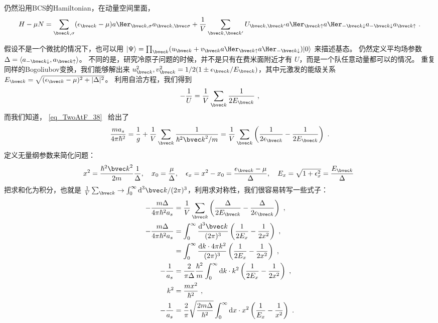 
仍然沿用BCS的Hamiltonian，在动量空间里面，
\begin{equation}
H-\mu N = \sum_{{\bvec k},\sigma}(\epsilon_{\bvec k}-\mu)a\Her_{{\bvec k},\sigma}a_{\bvec k, \bvec \sigma}+\frac{1}{V}\sum_{\bvec k,  \bvec k'}U_{\bvec k, \bvec k'}a\Her_{\bvec k\uparrow}a\Her_{-\bvec k\downarrow}a_{-\bvec k\downarrow}a_{\bvec k\uparrow}~.
\end{equation}


假设不是一个微扰的情况下，也可以用 $|\Psi\rangle = \prod_{\bvec k}(u_{\bvec k}+v_{\bvec k}a\Her_{\bvec k\uparrow}a\Her_{-\bvec k\downarrow})|0\rangle$ 来描述基态。 仍然定义平均场参数 $\Delta = \langle a_{-\bvec k\downarrow},a_{\bvec k\uparrow}\rangle$。 不同的是，研究冷原子问题的时候，并不是只有在费米面附近才有 $U$，而是一个队任意动量都可以的情况。 重复同样的Bogoliubov变换，我们能够解出来 $u_{\bvec k}^2, v_{\bvec k}^2 = 1/2(1\pm\epsilon_{\bvec k}/E_{\bvec k})$，其中元激发的能级关系$E_{\bvec k}=\sqrt{(\epsilon_{\bvec k}-\mu)^2+|\Delta|^2}$。 利用自洽方程，我们得到
\begin{equation}
-\frac{1}{U} = \frac{1}{V}\sum_{\bvec k}\frac{1}{2E_{\bvec k}}~,
\end{equation}
而我们知道， \autoref{eq_TwoAtF_38}~ 给出了
\begin{equation}
\frac{ma_s}{4\pi\hbar^2} = \frac{1}{g} + \frac{1}{V}\sum_{\bvec k}\frac{1}{\hbar^2{\bvec k}^2/m} = \frac{1}{V}\sum_{\bvec k}\left(\frac{1}{2\epsilon_{\bvec k}} - \frac{1}{2E_{\bvec k}}\right)~.
\end{equation}
定义无量纲参数来简化问题：
\begin{equation}
x^2 = \frac{\hbar^2{\bvec k}^2}{2m}\frac{1}{\Delta},\quad x_0 = \frac{\mu}{\Delta},\quad \epsilon_x = x^2-x_0 = \frac{\epsilon_{\bvec k}-\mu}{\Delta},\quad E_x = \sqrt{1+\epsilon_x^2} = \frac{E_{\bvec k}}{\Delta}~
\end{equation}
把求和化为积分，也就是 $\frac{1}{V}\sum_{\bvec k}\to\int_0^\infty \text{d}^3{\bvec k}/(2\pi)^3$，利用求对称性，我们很容易转写一些式子：
\begin{equation}
\begin{split}
-\frac{m\Delta}{4\pi\hbar^2 a_s} &=\frac{1}{V}\sum_{\bvec k}\left(\frac{\Delta}{2E_{\bvec k}} - \frac{\Delta}{2\epsilon_{\bvec k}}\right)~,\\
-\frac{m\Delta}{4\pi\hbar^2 a_s} &=\int_0^\infty\frac{\text{d}^3{\bvec k}}{(2\pi)^3}\left(\frac{1}{2E_x} - \frac{1}{2x^2}\right)~,\\
&=\int_0^\infty\frac{\text{d}k\cdot 4\pi k^2}{(2\pi)^3}\left(\frac{1}{2E_x} - \frac{1}{2x^2}\right)~,\\
-\frac{1}{a_s} &= \frac{2}{\pi\Delta}\frac{\hbar^2}{m}\int_0^\infty\text{d}k\cdot k^2\left(\frac{1}{2E_x} - \frac{1}{2x^2}\right)~,\\
k^2 &= \frac{mx^2}{\hbar^2}~,\\
-\frac{1}{a_s} &= \frac{2}{\pi}\sqrt{\frac{2m\Delta}{\hbar^2}}\int_0^\infty \text{d}x\cdot x^2\left(\frac{1}{E_x}-\frac{1}{x^2}\right)~.
\end{split}
\end{equation}

